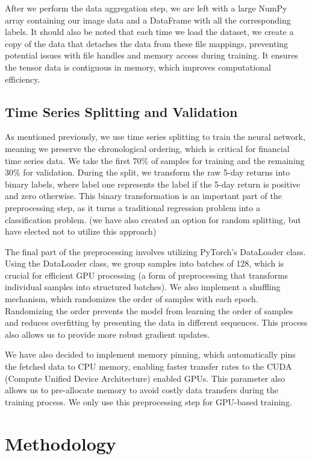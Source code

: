 \documentclass[12pt]{article}
\begin{document}
After we perform the data aggregation step, we are left with a large NumPy array containing our image data and a DataFrame with all the corresponding labels. It should also be noted that each time we load the dataset, we create a copy of the data that detaches the data from these file mappings, preventing potential issues with file handles and memory access during training. It ensures the tensor data is contiguous in memory, which improves computational efficiency.

\subsection*{Time Series Splitting and Validation}

As mentioned previously, we use time series splitting to train the neural network, meaning we preserve the chronological ordering, which is critical for financial time series data. We take the first 70\% of samples for training and the remaining 30\% for validation. During the split, we transform the raw 5-day returns into binary labels, where label one represents the label if the 5-day return is positive and zero otherwise. This binary transformation is an important part of the preprocessing step, as it turns a traditional regression problem into a classification problem. (we have also created an option for random splitting, but have elected not to utilize this approach)

The final part of the preprocessing involves utilizing PyTorch's DataLoader class. Using the DataLoader class, we group samples into batches of 128, which is crucial for efficient GPU processing (a form of preprocessing that transforms individual samples into structured batches). We also implement a shuffling mechanism, which randomizes the order of samples with each epoch. Randomizing the order prevents the model from learning the order of samples and reduces overfitting by presenting the data in different sequences. This process also allows us to provide more robust gradient updates.

We have also decided to implement memory pinning, which automatically pins the fetched data to CPU memory, enabling faster transfer rates to the CUDA (Compute Unified Device Architecture) enabled GPUs. This parameter also allows us to pre-allocate memory to avoid costly data transfers during the training process. We only use this preprocessing step for GPU-based training.

\section*{Methodology}
\end{document}
